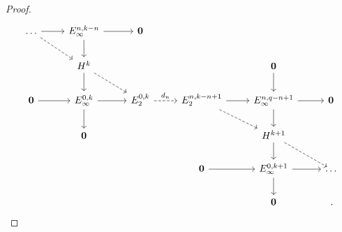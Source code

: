 \begin{ex}
\begin{thm}
\begin{proof}
\begin{equation*}
\begin{tikzcd}
					\dots \ar[r] \ar[dr, dashed] & E^{n,k-n}_{\infty} \ar[d] \ar[r]& \cat{0} & & & \\
					& H^{k} \ar[d] \ar[dr, dashed] & & & \cat{0} \ar[d] & \\
					\cat{0} \ar[r] & E^{0,k}_{\infty} \ar[r] \ar[d] & E^{0,k}_{2} \ar[r, "d_{n}", dashed]
					& E^{n,k-n+1}_{2} \ar[r] \ar[dr, dashed] & E^{n,q-n+1}_{\infty} \ar[r] \ar[d] & \cat{0} \\
					& \cat{0} & & & H^{k+1} \ar[d] \ar[dr, dashed] & \\
					& & & \cat{0} \ar[r] & E^{0,k+1}_{\infty} \ar[d] \ar[r] & \dots \\
					& & & & \cat{0} & \,.
				\end{tikzcd}
			\end{equation*}\qedhere
		\end{proof}
	\end{thm}
\end{ex}
































